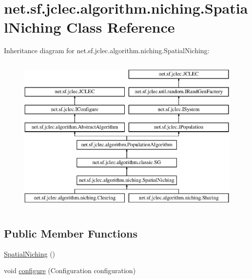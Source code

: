 \hypertarget{classnet_1_1sf_1_1jclec_1_1algorithm_1_1niching_1_1_spatial_niching}{\section{net.\-sf.\-jclec.\-algorithm.\-niching.\-Spatial\-Niching Class Reference}
\label{classnet_1_1sf_1_1jclec_1_1algorithm_1_1niching_1_1_spatial_niching}
}
Inheritance diagram for net.\-sf.\-jclec.\-algorithm.\-niching.\-Spatial\-Niching\-:\begin{figure}[H]
\begin{center}
\leavevmode
\includegraphics[height=8.000000cm]{classnet_1_1sf_1_1jclec_1_1algorithm_1_1niching_1_1_spatial_niching}
\end{center}
\end{figure}
\subsection*{Public Member Functions}
\begin{DoxyCompactItemize}
\item 
\hyperlink{classnet_1_1sf_1_1jclec_1_1algorithm_1_1niching_1_1_spatial_niching_a033cb8ece4626d5d0328fe9a0141501c}{Spatial\-Niching} ()
\item 
void \hyperlink{classnet_1_1sf_1_1jclec_1_1algorithm_1_1niching_1_1_spatial_niching_a70b75c7dd31e0d3eb64849cd3bd5de2a}{configure} (Configuration configuration)
\end{DoxyCompactItemize}
